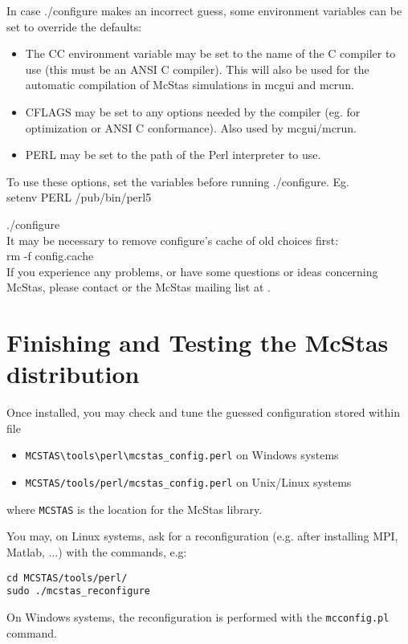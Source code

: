 In case ./configure makes an incorrect guess, some environment variables
can be set to override the defaults:
\begin{itemize}
\item{The CC environment variable may be set to the name of the C compiler
   to use (this must be an ANSI C compiler). This will also be used for
   the automatic compilation of McStas simulations in mcgui and
   mcrun.}
\item{CFLAGS may be set to any options needed by the compiler (eg. for
   optimization or ANSI C conformance). Also used by mcgui/mcrun.}
\item{PERL may be set to the path of the Perl interpreter to use.}
\end{itemize}
\noindent To use these options, set the variables before running ./configure. Eg.\\

    setenv PERL /pub/bin/perl5

    ./configure\\

\noindent It may be necessary to remove configure's cache of old
choices first:\\


    rm -f config.cache\\


\noindent If you experience any problems, or have some questions or ideas
concerning McStas, please contact
or the McStas mailing list at .

\section{Finishing and Testing the McStas distribution}
\label{s:testing}

Once installed, you may check and tune the guessed configuration stored within file
\begin{itemize}
\item{\verb+MCSTAS\tools\perl\mcstas_config.perl+ on Windows systems}
\item{\verb+MCSTAS/tools/perl/mcstas_config.perl+ on Unix/Linux systems}
\end{itemize}
where \verb+MCSTAS+ is the location for the McStas library.

You may, on Linux systems, ask for a reconfiguration (e.g. after installing MPI, Matlab, ...) with the commands, e.g:
\begin{verbatim}
cd MCSTAS/tools/perl/
sudo ./mcstas_reconfigure
\end{verbatim}
On Windows systems, the reconfiguration is performed with the \verb+mcconfig.pl+ command.

